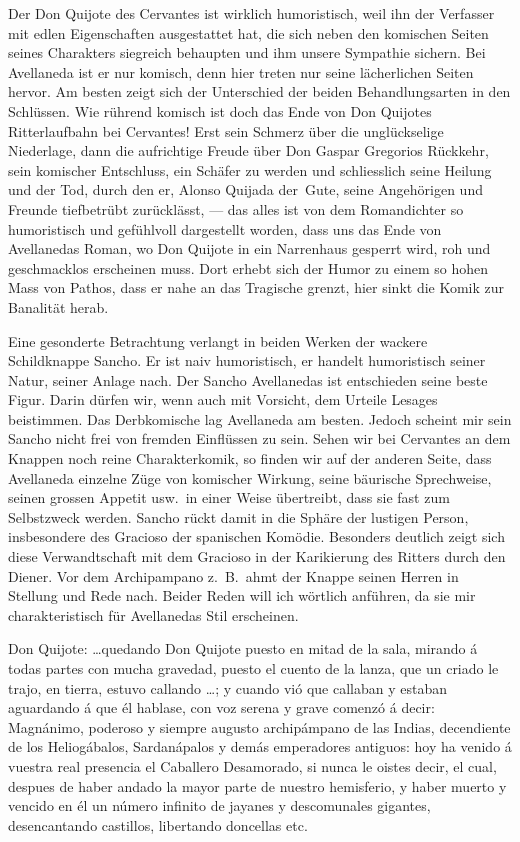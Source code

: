 Der Don Quijote des Cervantes ist wirklich humoristisch, weil ihn
der Verfasser mit edlen Eigenschaften ausgestattet hat, die sich neben
den komischen Seiten seines Charakters siegreich behaupten und ihm
unsere Sympathie sichern. Bei Avellaneda ist er nur komisch, denn
hier treten nur seine lächerlichen Seiten hervor. Am besten zeigt sich
der Unterschied der beiden Behandlungsarten in den Schlüssen. Wie
rührend komisch ist doch das Ende von Don Quijotes Ritterlaufbahn
bei Cervantes! Erst sein Schmerz über die unglückselige Niederlage,
dann die aufrichtige Freude über Don Gaspar Gregorios Rückkehr, sein
komischer Entschluss, ein Schäfer zu werden und schliesslich seine
Heilung und der Tod, durch den er, Alonso Quijada der~Gute, seine
Angehörigen und Freunde tiefbetrübt zurücklässt, --- das alles ist von
dem Romandichter so humoristisch und gefühlvoll dargestellt worden,
dass uns das Ende von Avellanedas Roman, wo Don Quijote in ein
Narrenhaus gesperrt wird, roh und geschmacklos erscheinen muss. Dort
erhebt sich der Humor zu einem so hohen Mass von Pathos, dass er
nahe an das Tragische grenzt, hier sinkt die Komik zur Banalität herab.

Eine gesonderte Betrachtung verlangt in beiden Werken der
wackere Schildknappe Sancho. Er ist naiv humoristisch, er handelt
humoristisch seiner Natur, seiner Anlage nach. Der Sancho Avellanedas
ist entschieden seine beste Figur. Darin dürfen wir, wenn auch mit
Vorsicht, dem Urteile Lesages beistimmen. Das Derbkomische lag
Avellaneda am besten. Jedoch scheint mir sein Sancho nicht frei von
fremden Einflüssen zu sein. Sehen wir bei Cervantes an dem Knappen
noch reine Charakterkomik, so finden wir auf der anderen Seite, dass
Avellaneda einzelne Züge von komischer Wirkung, seine bäurische
Sprechweise, seinen grossen Appetit usw.\ in einer Weise übertreibt,
dass sie fast zum Selbstzweck werden. Sancho rückt damit in die
Sphäre der {\quoted lustigen Person}, insbesondere des Gracioso der spanischen
Komödie. Besonders deutlich zeigt sich diese Verwandtschaft mit dem
Gracioso in der Karikierung des Ritters durch den Diener. Vor dem
{\quoted Archipampano} z.~B.\ ahmt der Knappe seinen Herren in Stellung und
Rede nach. Beider Reden will ich wörtlich anführen, da sie mir
charakteristisch für Avellanedas Stil erscheinen.

Don Quijote: \dots {\itquoted\spanish quedando Don Quijote puesto en mitad de la
sala, mirando á todas partes con mucha gravedad, puesto el cuento de
la lanza, que un criado le trajo, en tierra, estuvo callando \dots ; y
cuando vió que callaban y estaban aguardando á que él hablase, con
voz serena y grave comenzó á decir: Magnánimo, poderoso y siempre
augusto archipámpano de las Indias, decendiente de los Heliogábalos,
Sardanápalos y demás emperadores antiguos: hoy ha venido á vuestra
real presencia el Caballero Desamorado, si nunca le oistes decir, el
cual, despues de haber andado la mayor parte de nuestro hemisferio, y
haber muerto y vencido en él un número infinito de jayanes y descomunales
gigantes, desencantando castillos, libertando doncellas} etc.

